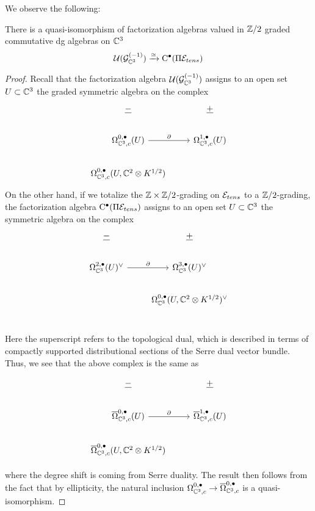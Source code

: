 We observe the following:
\begin{prop}
\label{prop:factabelian}
There is a quasi-isomorphism of factorization algebras valued in $\mathbb{Z}/2$ graded commutative dg algebras on $\mathbb{C}^3$
\[
\mathcal{U} (\mathcal{G}^{(-1)}_{\mathbb{C}^3} )\xrightarrow{\simeq} {\mathrm{C}}^\bullet(\Pi \mathcal{E}_{tens})
\]
\end{prop}

\begin{proof}
Recall that the factorization algebra $\mathcal{U}(\mathcal{G}_{\mathbb{C}^3}^{(-1)})$ assigns to an open set $U\subset \mathbb{C}^3$ the graded symmetric algebra on the complex
\begin{equation}\label{eqn:weight-1}
\begin{tikzcd}
\ul{-} & \ul{+}\\
\Omega_{\C^3, c}^{0,\bullet}(U) \ar[r,"\del"] & \Omega_{\C^3, c}^{1,\bullet}(U) \\
\Omega_{\C^3, c}^{0,\bullet}(U, \C^2\otimes K^{1/2}) & 
\end{tikzcd}
\end{equation}
On the other hand, if we totalize the $\mathbb{Z}\times\mathbb{Z}/2$-grading on $\mathcal{E}_{tens}$ to a $\mathbb{Z}/2$-grading, the factorization algebra ${\mathrm{C}}^\bullet (\Pi \mathcal{E}_{tens})$ assigns to an open set $U\subset \mathbb{C}^3$ the symmetric algebra on the complex 
\begin{equation}
\begin{tikzcd}
\ul{-} & \ul{+}\\
\Omega_{\C^3}^{2,\bullet}(U)^\vee \ar[r,"\del"] & \Omega_{\C^3}^{3,\bullet}(U)^\vee \\
& \Omega_{\C^3}^{0,\bullet}(U, \C^2\otimes K^{1/2})^\vee \\
\end{tikzcd}
\end{equation}

Here the superscript refers to the topological dual, which is described in terms of compactly supported distributional sections of the Serre dual vector bundle. Thus, we see that the above complex is the same as 

\begin{equation}
\begin{tikzcd}
\ul{-} & \ul{+}\\
\overline \Omega_{\C^3, c}^{0,\bullet}(U) \ar[r,"\del"] & \overline \Omega_{\C^3, c}^{1,\bullet}(U) \\
\overline \Omega_{\C^3, c}^{0,\bullet}(U, \C^2\otimes K^{1/2}) & 
\end{tikzcd}
\end{equation}

where the degree shift is coming from Serre duality. The result then follows from the fact that by ellipticity, the natural inclusion $\Omega^{0,\bullet}_{\mathbb{C}^3,c}\to\overline \Omega^{0,\bullet}_{\mathbb{C}^3,c}$ is a quasi-isomorphism.
\end{proof}

